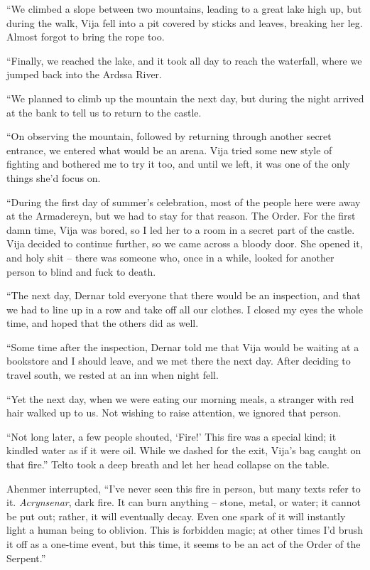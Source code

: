 ``We climbed a slope between two mountains, leading to a great lake high up, but during the walk, Vija fell into a pit covered by sticks and leaves, breaking her leg. Almost forgot to bring the rope too.

``Finally, we reached the lake, and it took all day to reach the waterfall, where we jumped back into the Ardssa River.

``We planned to climb up the mountain the next day, but during the night \yronsyncra{} arrived at the bank to tell us to return to the castle.

``On observing the mountain, followed by returning through another secret entrance, we entered what would be an arena. Vija tried some new style of fighting and bothered me to try it too, and until we left, it was one of the only things she'd focus on.

``During the first day of summer's celebration, most of the people here were away at the Armadereyn, but we had to stay for that reason. The Order. For the first damn time, Vija was bored, so I led her to a room in a secret part of the castle. Vija decided to continue further, so we came across a bloody door. She opened it, and holy shit -- there was someone who, once in a while, looked for another person to blind and fuck to death.

``The next day, Dernar told everyone that there would be an inspection, and that we had to line up in a row and take off all our clothes. I closed my eyes the whole time, and hoped that the others did as well.

``Some time after the inspection, Dernar told me that Vija would be waiting at a bookstore and I should leave, and we met there the next day. After deciding to travel south, we rested at an inn when night fell.

``Yet the next day, when we were eating our morning meals, a stranger with red hair walked up to us. Not wishing to raise attention, we ignored that person.

``Not long later, a few people shouted, `Fire!' This fire was a special kind; it kindled water as if it were oil. While we dashed for the exit, Vija's bag caught on that fire.'' Telto took a deep breath and let her head collapse on the table.

Ahenmer interrupted, ``I've never seen this fire in person, but many texts refer to it. \emph{Acrynsenar}, dark fire. It can burn anything -- stone, metal, or water; it cannot be put out; rather, it will eventually decay. Even one spark of it will instantly light a human being to oblivion. This is forbidden magic; at other times I'd brush it off as a one-time event, but this time, it seems to be an act of the Order of the Serpent.''

